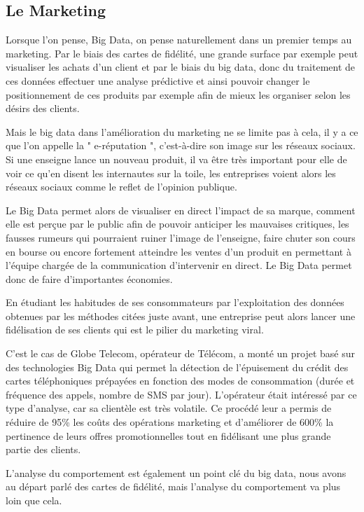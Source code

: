 \documentclass[12pt]{article}
\begin{document}
\subsection{Le Marketing}
Lorsque l'on pense, Big Data, on pense naturellement dans un premier temps au marketing. 
Par le biais des cartes de fidélité, une grande surface par exemple peut visualiser les achats d'un client et par le biais du big data, donc du traitement de ces données effectuer une analyse prédictive et ainsi pouvoir changer le positionnement de ces produits par exemple afin de mieux les organiser selon les désirs des clients. \par
Mais le big data dans l'amélioration du marketing ne se limite pas à cela, il y a ce que l'on appelle la " e-réputation ", c'est-à-dire son image sur les réseaux sociaux. Si une enseigne lance un nouveau produit, il va être très important pour elle de voir ce qu'en disent les internautes sur la toile, les entreprises voient alors les réseaux sociaux comme le reflet de l'opinion publique. \par
 Le Big Data permet alors de visualiser en direct l'impact de sa marque, comment elle est perçue par le public afin de pouvoir anticiper les mauvaises critiques, les fausses rumeurs qui pourraient ruiner l'image de l'enseigne, faire chuter son cours en bourse ou encore fortement atteindre les ventes d'un produit en permettant à l'équipe chargée de la communication d'intervenir en direct. Le Big Data permet donc de faire d'importantes économies.\par
En étudiant les habitudes de ses consommateurs par l'exploitation des données obtenues par les méthodes citées juste avant, une entreprise peut alors lancer une fidélisation de ses clients qui est le pilier du marketing viral.\par
C'est le cas de Globe Telecom, opérateur de Télécom, a monté un projet basé sur des technologies Big Data qui permet la détection de l’épuisement du crédit des cartes téléphoniques prépayées en fonction des modes de consommation (durée et fréquence des appels, nombre de SMS par jour). L’opérateur était intéressé par ce type d’analyse, car sa clientèle est très volatile. Ce procédé leur a permis de réduire de 95\% les coûts des opérations marketing et d’améliorer de 600\% la pertinence de leurs offres promotionnelles tout en fidélisant une plus grande partie des clients.\par
L'analyse du comportement est également un point clé du big data, nous avons au départ parlé des cartes de fidélité, mais l'analyse du comportement va plus loin que cela.
\end{document}
